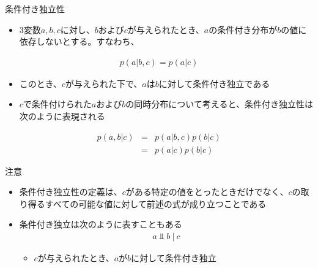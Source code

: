 \begin{frame}{条件付き独立性}
 \begin{itemize}
  \item 3変数$a,b,c$に対し、$b$および$c$が与えられたとき、$a$の条件付き分布が$b$の値に依存しないとする。すなわち、
 \end{itemize}
 \begin{eqnarray*}
  p(a|b,c) = p(a|c)
 \end{eqnarray*}
 \begin{itemize}
  \item このとき、$c$が与えられた下で、$a$は$b$に対して条件付き独立である

  \item $c$で条件付けられた$a$および$b$の同時分布について考えると、条件付き独立性は次のように表現される
 \end{itemize}
 \begin{eqnarray*}
  p(a,b|c) &=& p(a|b,c)p(b|c)\\
  &= & p(a|c)p(b|c)
 \end{eqnarray*}
\end{frame}

\begin{frame}{注意}
 \begin{itemize}
  \item 条件付き独立性の定義は、$c$がある特定の値をとったときだけでなく、$c$の取り得るすべての可能な値に対して前述の式が成り立つことである
  \item 条件付き独立は次のように表すこともある
        \begin{eqnarray*}
         a \Perp b \ | \ c
        \end{eqnarray*}
        \begin{itemize}
         \item $c$が与えられたとき、$a$が$b$に対して条件付き独立
        \end{itemize}
 \end{itemize}
\end{frame}
